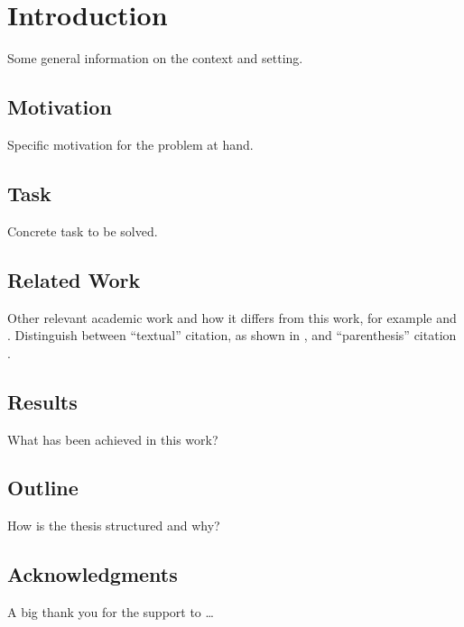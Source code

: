 %
% 


\chapter{Introduction}

Some general information on the context and setting. \blindtext{}

\Blindtext[2][2]

\section{Motivation}

Specific motivation for the problem at hand. \blindtext{}

\blindtext[2]

\section{Task}

Concrete task to be solved. \blindtext{}

\blindtext{}


\section{Related Work}

Other relevant academic work and how it differs from this work, for
example \citet{shannon_diff} and \citet{blowfish}. Distinguish between
``textual'' citation, as shown in \citet{shannon_diff}, and
``parenthesis'' citation \citep{blowfish}.

\Blindtext[3][1]


\section{Results}

What has been achieved in this work? \blindtext{}

\blindtext[2][1]

\section{Outline}

How is the thesis structured and why? \blindtext{}


\section{Acknowledgments}

A big thank you for the support to \ldots \blindtext

